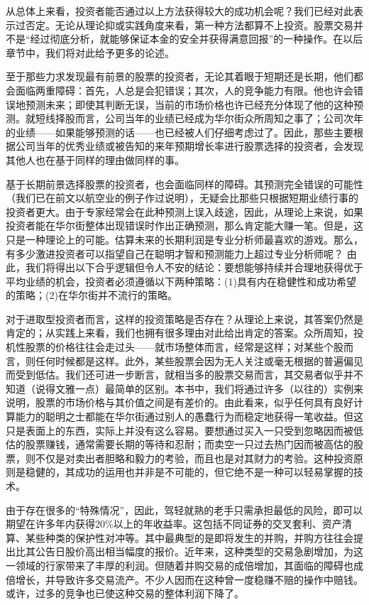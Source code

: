 \documentclass[12pt,oneside]{book}
\begin{document}
从总体上来看，投资者能否通过以上方法获得较大的成功机会呢？我们已经对此表示过否定。无论从理论抑或实践角度来看，第一种方法都算不上投资。股票交易并不是“经过彻底分析，就能够保证本金的安全并获得满意回报”的一种操作。在以后章节中，我们将对此给予更多的论述。

至于那些力求发现最有前景的股票的投资者，无论其着眼于短期还是长期，他们都会面临两重障碍：首先，人总是会犯错误；其次，人的竞争能力有限。他也许会错误地预测未来；即使其判断无误，当前的市场价格也许已经充分体现了他的这种预测。就短线择股而言，公司当年的业绩已经成为华尔街众所周知之事了；公司次年的业绩——如果能够预测的话——也已经被人们仔细考虑过了。因此，那些主要根据公司当年的优秀业绩或被告知的来年预期增长率进行股票选择的投资者，会发现其他人也在基于同样的理由做同样的事。

基于长期前景选择股票的投资者，也会面临同样的障碍。其预测完全错误的可能性（我们已在前文以航空业的例子作过说明），无疑会比那些只根据短期业绩行事的投资者更大。由于专家经常会在此种预测上误入歧途，因此，从理论上来说，如果投资者能在华尔街整体出现错误时作出正确预测，那么肯定能大赚一笔。但是，这只是一种理论上的可能。估算未来的长期利润是专业分析师最喜欢的游戏。那么，有多少激进投资者可以指望自己在聪明才智和预测能力上超过专业分析师呢？
由此，我们将得出以下合乎逻辑但令人不安的结论：要想能够持续并合理地获得优于平均业绩的机会，投资者必须遵循以下两种策略：(1)具有内在稳健性和成功希望的策略；(2)在华尔街并不流行的策略。

对于进取型投资者而言，这样的投资策略是否存在？从理论上来说，其答案仍然是肯定的；从实践上来看，我们也拥有很多理由对此给出肯定的答案。众所周知，投机性股票的价格往往会走过头——就市场整体而言，经常是这样；对某些个股而言，则任何时候都是这样。此外，某些股票会因为无人关注或毫无根据的普遍偏见而受到低估。我们还可进一步断言，就相当多的股票交易而言，其交易者似乎并不知道（说得文雅一点）最简单的区别。本书中，我们将通过许多（以往的）实例来说明，股票的市场价格与其价值之间是有差价的。由此看来，似乎任何具有良好计算能力的聪明之士都能在华尔街通过别人的愚蠢行为而稳定地获得一笔收益。但这只是表面上的东西，实际上并没有这么容易。要想通过买入一只受到忽略因而被低估的股票赚钱，通常需要长期的等待和忍耐；而卖空一只过去热门因而被高估的股票，则不仅是对卖出者胆略和毅力的考验，而且也是对其财力的考验。这种投资原则是稳健的，其成功的运用也并非是不可能的，但它绝不是一种可以轻易掌握的技术。

由于存在很多的“特殊情况”，因此，驾轻就熟的老手只需承担最低的风险，即可以期望在许多年内获得20\%以上的年收益率。这包括不同证券的交叉套利、资产清算、某些种类的保护性对冲等。其中最典型的是即将发生的并购，并购方往往会提出比其公告日股价高出相当幅度的报价。近年来，这种类型的交易急剧增加，为这一领域的行家带来了丰厚的利润。但随着并购交易的成倍增加，其面临的障碍也成倍增长，并导致许多交易流产。不少人因而在这种曾一度稳赚不赔的操作中赔钱。或许，过多的竞争也已使这种交易的整体利润下降了。
\end{document}
